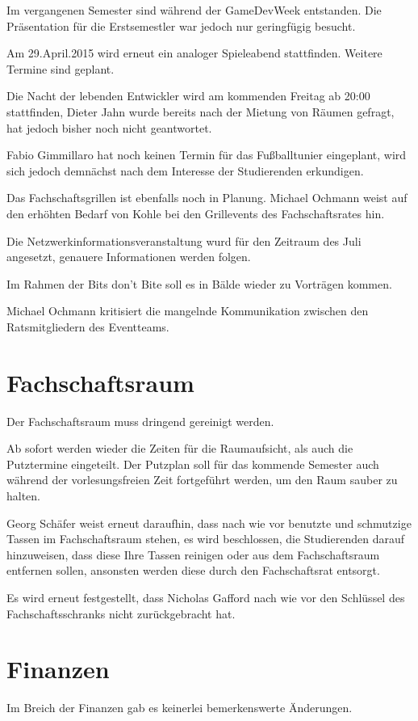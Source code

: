 \documentclass[a4paper, 11pt]{article} %
\begin{document}
Im vergangenen Semester sind während der GameDevWeek entstanden. Die Präsentation für die Erstsemestler war jedoch nur geringfügig besucht.

Am 29.April.2015 wird erneut ein analoger Spieleabend stattfinden. Weitere Termine sind geplant.

Die Nacht der lebenden Entwickler wird am kommenden Freitag ab 20:00 stattfinden, Dieter Jahn wurde bereits nach der Mietung von Räumen gefragt, hat jedoch bisher noch nicht geantwortet.

Fabio Gimmillaro hat noch keinen Termin für das Fußballtunier eingeplant, wird sich jedoch demnächst nach dem Interesse der Studierenden erkundigen.

Das Fachschaftsgrillen ist ebenfalls noch in Planung. Michael Ochmann weist auf den erhöhten Bedarf von Kohle bei den Grillevents des Fachschaftsrates hin.

Die Netzwerkinformationsveranstaltung wurd für den Zeitraum des Juli angesetzt, genauere Informationen werden folgen.

Im Rahmen der Bits don't Bite soll es in Bälde wieder  zu Vorträgen kommen.

Michael Ochmann kritisiert die mangelnde Kommunikation zwischen den Ratsmitgliedern des Eventteams.
\pagebreak
\section{Fachschaftsraum}
Der Fachschaftsraum muss dringend gereinigt werden.

Ab sofort werden wieder die Zeiten für die Raumaufsicht, als auch die Putztermine eingeteilt.
Der Putzplan soll für das kommende Semester auch während der vorlesungsfreien Zeit fortgeführt werden, um den Raum sauber zu halten.

Georg Schäfer weist erneut daraufhin, dass nach wie vor benutzte und schmutzige Tassen im Fachschaftsraum stehen, es wird beschlossen, die Studierenden darauf hinzuweisen, dass diese Ihre Tassen reinigen oder aus dem Fachschaftsraum entfernen sollen, ansonsten werden diese durch den Fachschaftsrat entsorgt.

Es wird erneut festgestellt, dass Nicholas Gafford nach wie vor den Schlüssel des Fachschaftsschranks nicht zurückgebracht hat.
\pagebreak
\section{Finanzen}
Im Breich der Finanzen gab es keinerlei bemerkenswerte Änderungen.
\pagebreak
\end{document}
